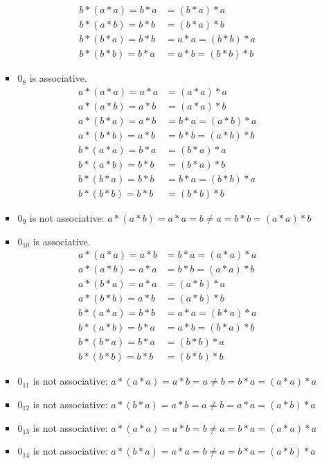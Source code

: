 \begin{enumerate}[label={\Alph*.},font={\bfseries}]
\begin{enumerate}[label={\arabic*},font={\bfseries}]
\begin{itemize}
\begin{align*}
              b*(a*a) = b*a &= (b*a)*a \\
              b*(a*b) = b*b &= (b*a)*b \\
              b*(b*a) = b*b &= a*a = (b*b)*a \\
              b*(b*b) = b*a &= a*b = (b*b)*b
            \end{align*}
          \item $0_8$ is associative.
            \begin{align*}
              a*(a*a) = a*a &= (a*a)*a \\
              a*(a*b) = a*b &= (a*a)*b \\
              a*(b*a) = a*b &= b*a = (a*b)*a \\
              a*(b*b) = a*b &= b*b = (a*b)*b \\
              b*(a*a) = b*a &= (b*a)*a \\
              b*(a*b) = b*b &= (b*a)*b \\
              b*(b*a) = b*b &= b*a = (b*b)*a \\
              b*(b*b) = b*b &= (b*b)*b
            \end{align*}
          \item $0_9$ is not associative: $a*(a*b)=a*a=b \neq a=b*b=(a*a)*b$
          \item $0_{10}$ is associative.
            \begin{align*}
              a*(a*a) = a*b &= b*a = (a*a)*a \\
              a*(a*b) = a*a &= b*b = (a*a)*b \\
              a*(b*a) = a*a &= (a*b)*a \\
              a*(b*b) = a*b &= (a*b)*b \\
              b*(a*a) = b*b &= a*a = (b*a)*a \\
              b*(a*b) = b*a &= a*b = (b*a)*b \\
              b*(b*a) = b*a &= (b*b)*a \\
              b*(b*b) = b*b &= (b*b)*b
            \end{align*}
          \item $0_{11}$ is not associative: $a*(a*a)=a*b=a \neq b=b*a=(a*a)*a$
          \item $0_{12}$ is not associative: $a*(b*a)=a*b=a \neq b=a*a=(a*b)*a$
          \item $0_{13}$ is not associative: $a*(a*a)=a*b=b \neq a=b*a=(a*a)*a$
          \item $0_{14}$ is not associative: $a*(b*a)=a*a=b \neq a=b*a=(a*b)*a$

\end{itemize}
\end{enumerate}
\end{enumerate}
